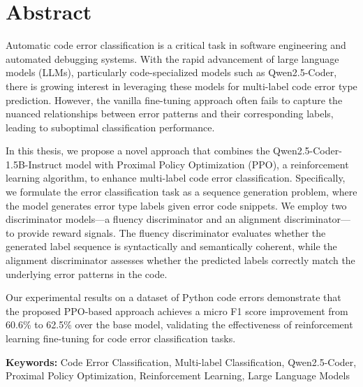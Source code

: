 \chapter*{Abstract}
\begingroup
\justifying
\setlength{\parindent}{0pt}
\setlength{\parskip}{0.5\baselineskip}

Automatic code error classification is a critical task in software engineering and automated debugging systems. With the rapid advancement of large language models (LLMs), particularly code-specialized models such as Qwen2.5-Coder, there is growing interest in leveraging these models for multi-label code error type prediction. However, the vanilla fine-tuning approach often fails to capture the nuanced relationships between error patterns and their corresponding labels, leading to suboptimal classification performance.

In this thesis, we propose a novel approach that combines the Qwen2.5-Coder-1.5B-Instruct model with Proximal Policy Optimization (PPO), a reinforcement learning algorithm, to enhance multi-label code error classification. Specifically, we formulate the error classification task as a sequence generation problem, where the model generates error type labels given error code snippets. We employ two discriminator models---a fluency discriminator and an alignment discriminator---to provide reward signals. The fluency discriminator evaluates whether the generated label sequence is syntactically and semantically coherent, while the alignment discriminator assesses whether the predicted labels correctly match the underlying error patterns in the code.

Our experimental results on a dataset of Python code errors demonstrate that the proposed PPO-based approach achieves a micro F1 score improvement from 60.6\% to 62.5\% over the base model, validating the effectiveness of reinforcement learning fine-tuning for code error classification tasks.

\textbf{Keywords:} Code Error Classification, Multi-label Classification, Qwen2.5-Coder, Proximal Policy Optimization, Reinforcement Learning, Large Language Models

\endgroup
